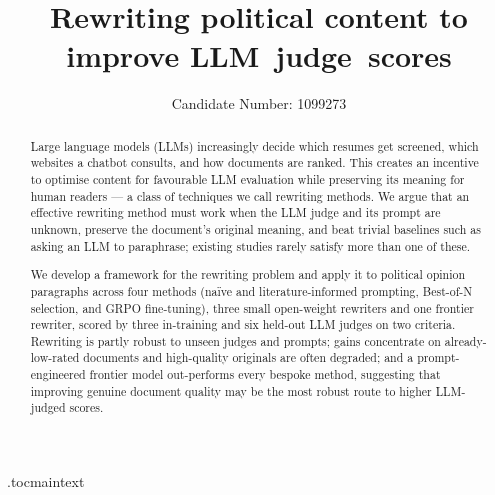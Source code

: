 \documentclass{article}
\title{Rewriting political content to improve LLM~judge~scores}
\author{%
  Candidate Number: 1099273 \\
}
\begin{document}
\maketitle

\etocdepthtag.toc{maintext}

\begin{abstract}
Large language models (LLMs) increasingly decide which resumes get screened, which websites a chatbot consults, and how documents are ranked. This creates an incentive to optimise content for favourable LLM evaluation while preserving its meaning for human readers — a class of techniques we call rewriting methods. We argue that an effective rewriting method must work when the LLM judge and its prompt are unknown, preserve the document's original meaning, and beat trivial baselines such as asking an LLM to paraphrase; existing studies rarely satisfy more than one of these.

We develop a framework for the rewriting problem and apply it to political opinion paragraphs across four methods (naïve and literature-informed prompting, Best-of-N selection, and GRPO fine-tuning), three small open-weight rewriters and one frontier rewriter, scored by three in-training and six held-out LLM judges on two criteria. Rewriting is partly robust to unseen judges and prompts; gains concentrate on already-low-rated documents and high-quality originals are often degraded; and a prompt-engineered frontier model out-performs every bespoke method, suggesting that improving genuine document quality may be the most robust route to higher LLM-judged scores.
\end{abstract}












\end{document}
